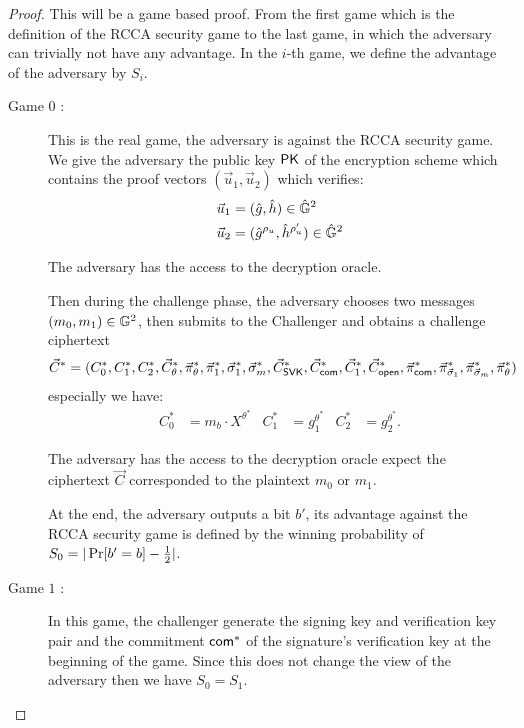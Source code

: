 \begin{proof}

  This will be a game based proof. From the first game which is the definition of the RCCA security game to the last game, in which the adversary can trivially not have any advantage. In the $i$-th game, we define the advantage of the adversary by $S_i$.

  \begin{description}
  \item[\textsf{Game} $0$ :] This is the real game, the adversary is against the RCCA security game. We give the adversary the public key $\mathsf{PK}$ of the encryption scheme which contains the proof vectors $(\vec{u}_1, \vec{u}_2)$ which verifies:
    \begin{align*}
      \vec{u}_1 &= (\hat{g}, \hat{h}) \in \hat{\mathbb{G}}^2\\
      \vec{u}_2 &= (\hat{g}^{\rho_u}, \hat{h}^{\rho_u'}) \in \hat{\mathbb{G}}^2
    \end{align*}

    The adversary has the access to the decryption oracle.
    
    Then during the challenge phase, the adversary chooses two messages $(m_0, m_1) \in \mathbb{G}^2$, then submits to the Challenger and obtains a challenge ciphertext
    \begin{align*}
      \vec{C}^* = (C_0^*, C_1^*, C_2^*, \vec{C}_{\theta}^*, \vec{\pi}_{\theta}^*, \vec{\pi}_{1}^*, \vec{\sigma}_1^*, \vec{\sigma}_m^*, \vec{C}_{\mathsf{SVK}}^*, \vec{C}_{\mathsf{com}}^*, \vec{C}_1^*, \vec{C}_{\mathsf{open}}^*, \vec{\pi}_{\mathsf{com}}^*, \vec{\pi}_{\vec{\sigma}_1}^*, \vec{\pi}_{\vec{\sigma}_m}^*, \vec{\pi}_{\theta}^*)
    \end{align*}
    especially we have:
    \begin{align*}
      C_0^* &= m_b \cdot X^{\theta^*} & C_1^* &= g_1^{\theta^*} & C_2^* &= g_2^{\theta^*}.
    \end{align*}

    The adversary has the access to the decryption oracle expect the ciphertext $\vec{C}$ corresponded to the plaintext $m_0$ or $m_1$.

    At the end, the adversary outputs a bit $b'$, its advantage against the RCCA security game is defined by the winning probability of $S_0 = |\operatorname{Pr}[b' = b] - \frac{1}{2}|$.

  \item[\textsf{Game} $1$ :] In this game, the challenger generate the signing key and verification key pair and the commitment $\mathsf{com}^*$ of the signature's verification key at the beginning of the game. Since this does not change the view of the adversary then we have $S_0 = S_1$.


\end{description}
\end{proof}
